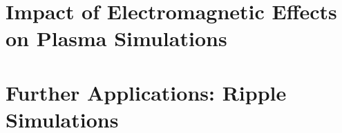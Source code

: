 \documentclass[english]{amu_these}
\begin{document}
	\part[Impact of Electromagnetic Effects on Plasma Simulations]{Impact of Electromagnetic Effects on Plasma Simulations}
	\label{part:EM_Impact}
	
	
	
	\part[Further Applications: Ripple Simulations]{Further Applications: Ripple Simulations}
	\label{part:Ripple}
	

	

	\appendix

	\newpage
	\printbibliography[heading=bibintoc] %
	
	\newpage
	\printindex							%
	
	\newpage
	\printendnotes						%

\end{document}
